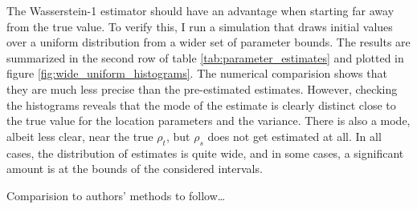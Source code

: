 The Wasserstein-1 estimator should have an advantage when starting far away from the true value.
To verify this, I run a simulation that draws initial values over a uniform distribution from a wider set of parameter bounds.
The results are summarized in the second row of table \ref{tab:parameter_estimates} and plotted in figure \ref{fig:wide_uniform_histograms}.
The numerical comparision shows that they are much less precise than the pre-estimated estimates.
However, checking the histograms reveals that the mode of the estimate is clearly distinct close to the true value for the location parameters and the variance.
There is also a mode, albeit less clear, near the true $\rho_t$, but $\rho_s$ does not get estimated at all.
In all cases, the distribution of estimates is quite wide, and in some cases, a significant amount is at the bounds of the considered intervals.

Comparision to authors' methods to follow\dots